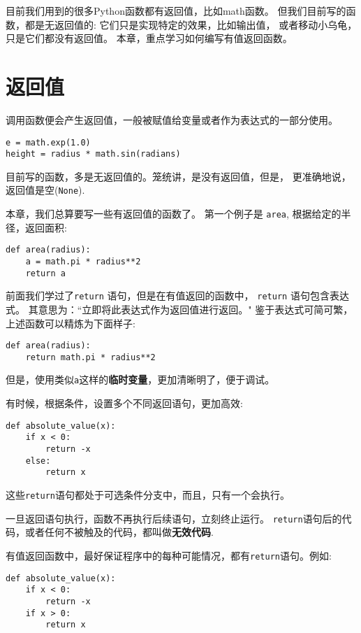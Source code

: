 \documentclass[10pt]{book}
\begin{document}
目前我们用到的很多Python函数都有返回值，比如math函数。
但我们目前写的函数，都是无返回值的: 它们只是实现特定的效果，比如输出值，
或者移动小乌龟，只是它们都没有返回值。
本章，重点学习如何编写有值返回函数。

\section{返回值}

调用函数便会产生返回值，一般被赋值给变量或者作为表达式的一部分使用。

\begin{verbatim}
e = math.exp(1.0)
height = radius * math.sin(radians)
\end{verbatim}
%
目前写的函数，多是无返回值的。笼统讲，是没有返回值，但是，
更准确地说，返回值是空({\tt None}).

本章，我们总算要写一些有返回值的函数了。
第一个例子是 {\tt area}, 根据给定的半径，返回面积:

\begin{verbatim}
def area(radius):
    a = math.pi * radius**2
    return a
\end{verbatim}
%
前面我们学过了{\tt return} 语句，但是在有值返回的函数中，
{\tt return} 语句包含表达式。
其意思为：``立即将此表达式作为返回值进行返回。"
鉴于表达式可简可繁，上述函数可以精炼为下面样子:

\begin{verbatim}
def area(radius):
    return math.pi * radius**2
\end{verbatim}
%
但是，使用类似{\tt a}这样的{\bf 临时变量}，更加清晰明了，便于调试。

有时候，根据条件，设置多个不同返回语句，更加高效:

\begin{verbatim}
def absolute_value(x):
    if x < 0:
        return -x
    else:
        return x
\end{verbatim}
%
这些{\tt return}语句都处于可选条件分支中，而且，只有一个会执行。

一旦返回语句执行，函数不再执行后续语句，立刻终止运行。
{\tt return}语句后的代码，或者任何不被触及的代码，都叫做{\bf 无效代码}.

有值返回函数中，最好保证程序中的每种可能情况，都有{\tt return}语句。例如:

\begin{verbatim}
def absolute_value(x):
    if x < 0:
        return -x
    if x > 0:
        return x
\end{verbatim}
%
\end{document}
